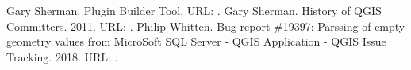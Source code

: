 \documentclass[a4paper,11pt,english]{sphinxmanual}
\begin{document}
\begin{sphinxthebibliography}{10}
Gary Sherman. Plugin Builder Tool. URL: .
Gary Sherman. History of QGIS Committers. 2011. URL: .
Philip Whitten. Bug report \#19397: Parssing of empty geometry values from MicroSoft SQL Server - QGIS Application - QGIS Issue Tracking. 2018. URL: .
\end{sphinxthebibliography}



\renewcommand{\indexname}{Index}
\printindex
\end{document}
